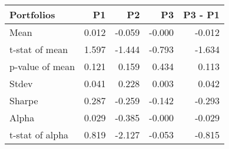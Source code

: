 \begin{tabular}{lrrrr}
\toprule
Portfolios & P1 & P2 & P3 & P3 - P1 \\
\midrule
Mean & 0.012 & -0.059 & -0.000 & -0.012 \\
t-stat of mean & 1.597 & -1.444 & -0.793 & -1.634 \\
p-value of mean & 0.121 & 0.159 & 0.434 & 0.113 \\
Stdev & 0.041 & 0.228 & 0.003 & 0.042 \\
Sharpe & 0.287 & -0.259 & -0.142 & -0.293 \\
Alpha & 0.029 & -0.385 & -0.000 & -0.029 \\
t-stat of alpha & 0.819 & -2.127 & -0.053 & -0.815 \\
\bottomrule
\end{tabular}
